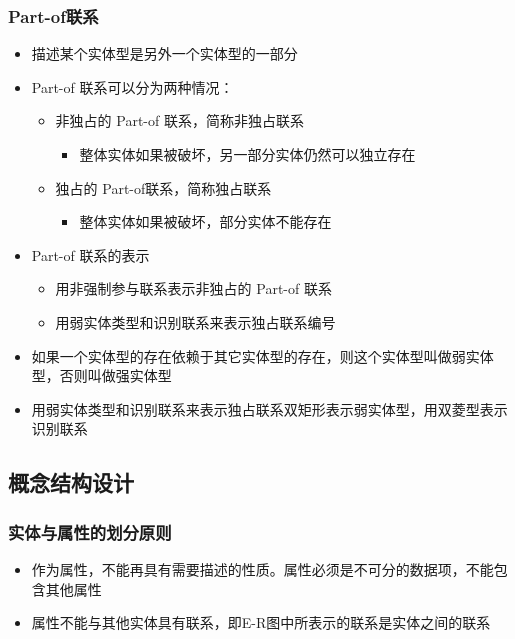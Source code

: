 \subsubsection{Part-of联系}
\begin{itemize}
    \item 描述某个实体型是另外一个实体型的一部分
    \item Part-of 联系可以分为两种情况：
    \begin{itemize}
        \item 非独占的 Part-of 联系，简称非独占联系
        \begin{itemize}
            \item 整体实体如果被破坏，另一部分实体仍然可以独立存在
        \end{itemize}
        \item 独占的 Part-of联系，简称独占联系
        \begin{itemize}
            \item 整体实体如果被破坏，部分实体不能存在
        \end{itemize}
    \end{itemize}
    \item Part-of 联系的表示
    \begin{itemize}
        \item 用非强制参与联系表示非独占的 Part-of 联系
        \item 用弱实体类型和识别联系来表示独占联系编号
    \end{itemize}
    \item 如果一个实体型的存在依赖于其它实体型的存在，则这个实体型叫做弱实体型，否则叫做强实体型
    \item 用弱实体类型和识别联系来表示独占联系双矩形表示弱实体型，用双菱型表示识别联系
\end{itemize}

\subsection{概念结构设计}

\subsubsection{实体与属性的划分原则}
\begin{itemize}
    \item 作为属性，不能再具有需要描述的性质。属性必须是不可分的数据项，不能包含其他属性
    \item 属性不能与其他实体具有联系，即E-R图中所表示的联系是实体之间的联系
\end{itemize}

